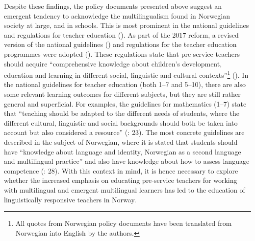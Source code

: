 \documentclass[output=paper]{langscibook}
\begin{document}
Despite these findings, the policy documents presented above suggest an emergent tendency to acknowledge the multilingualism found in Norwegian society at large, and in schools. This is most prominent in the national guidelines and regulations for teacher education (\citealt{MER2016,UHR2016}). As part of the 2017 reform, a revised version of the national guidelines (\citealt{UHR2016}) and regulations for the teacher education programmes were adopted (\citealt{MER2016}). These regulations state that pre-service teachers should acquire “comprehensive knowledge about children’s development, education and learning in different social, linguistic and cultural contexts”\footnote{All quotes from Norwegian policy documents have been translated from Norwegian into English by the authors.}  (\citealt{MER2016}). In the national guidelines for teacher education (both 1--7 and 5--10), there are also some relevant learning outcomes for different subjects, but they are still rather general and superficial. For examples, the guidelines for mathematics (1--7) state that “teaching should be adapted to the different needs of students, where the different cultural, linguistic and social backgrounds should both be taken into account but also considered a resource” (\citealt{MER2016}: 23). The most concrete guidelines are described in the subject of Norwegian, where it is stated that students should have “knowledge about language and identity, Norwegian as a second language and multilingual practice” and also have knowledge about how to assess language competence (\citealt{MER2016}: 28). With this context in mind, it is hence necessary to explore whether the increased emphasis on educating pre-service teachers for working with multilingual and emergent multilingual learners has led to the education of linguistically responsive teachers in Norway.
\end{document}
